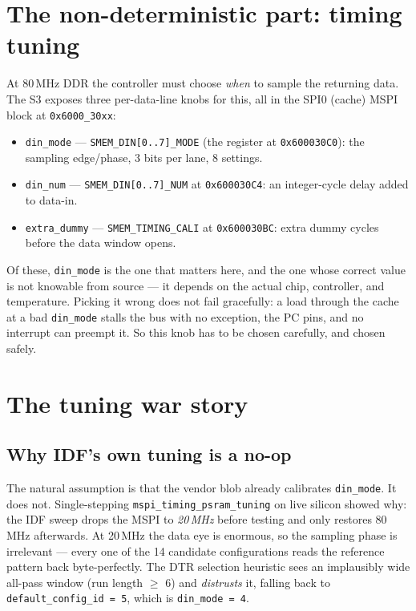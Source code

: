 \section{The non-deterministic part: timing tuning}

At 80\,MHz DDR the controller must choose \emph{when} to sample the returning data.
The S3 exposes three per-data-line knobs for this, all in the SPI0 (cache) MSPI block
at \texttt{0x6000\_30xx}:

\begin{itemize}
\item \texttt{din\_mode} --- \texttt{SMEM\_DIN[0..7]\_MODE} (the register at
\texttt{0x600030C0}): the sampling edge/phase, 3 bits per lane, 8 settings.
\item \texttt{din\_num} --- \texttt{SMEM\_DIN[0..7]\_NUM} at \texttt{0x600030C4}: an
integer-cycle delay added to data-in.
\item \texttt{extra\_dummy} --- \texttt{SMEM\_TIMING\_CALI} at \texttt{0x600030BC}:
extra dummy cycles before the data window opens.
\end{itemize}

Of these, \texttt{din\_mode} is the one that matters here, and the one whose correct
value is not knowable from source --- it depends on the actual chip, controller, and
temperature. Picking it wrong does not fail gracefully: a load through the cache at a
bad \texttt{din\_mode} stalls the bus with no exception, the PC pins, and no interrupt
can preempt it. So this knob has to be chosen carefully, and chosen safely.

\section{The tuning war story}

\subsection{Why IDF's own tuning is a no-op}

The natural assumption is that the vendor blob already calibrates \texttt{din\_mode}.
It does not. Single-stepping \texttt{mspi\_timing\_psram\_tuning} on live silicon
showed why: the IDF sweep drops the MSPI to \emph{20\,MHz} before testing and only
restores 80\,MHz afterwards. At 20\,MHz the data eye is enormous, so the sampling
phase is irrelevant --- every one of the 14 candidate configurations reads the
reference pattern back byte-perfectly. The DTR selection heuristic sees an
implausibly wide all-pass window (run length $\ge$ 6) and \emph{distrusts} it, falling
back to \texttt{default\_config\_id = 5}, which is \texttt{din\_mode = 4}.

